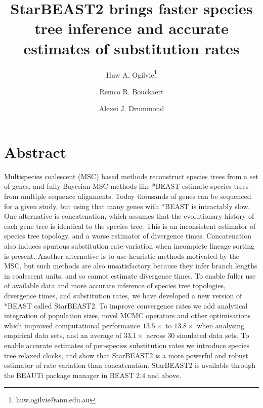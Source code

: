 \documentclass[12pt]{article}
\begin{document}
\title{StarBEAST2 brings faster species tree inference and accurate estimates of substitution rates}
\author[1,2]{Huw A. Ogilvie\thanks{huw.ogilvie@anu.edu.au}}
\author[2,3]{Remco R. Bouckaert}
\author[2,3]{Alexei J. Drummond}

\maketitle

\clearpage

\justifying

\section*{Abstract}

Multispecies coalescent (MSC) based methods reconstruct species trees from a
set of genes, and fully Bayesian MSC methods like *BEAST estimate species
trees from multiple sequence alignments. Today thousands of genes can be
sequenced for a given study, but using that many genes with *BEAST is
intractably slow. One alternative is concatenation, which assumes that the
evolutionary history of each gene tree is identical to the species tree. This
is an inconsistent estimator of species tree topology, and a worse estimator
of divergence times. Concatenation also induces spurious substitution rate
variation when incomplete lineage sorting is present. Another alternative is
to use heuristic methods motivated by the MSC, but such methods are also
unsatisfactory because they infer branch lengths in coalescent units, and so
cannot estimate divergence times. To enable fuller use of available data and
more accurate inference of species tree topologies, divergence times, and
substitution rates, we have developed a new version of *BEAST called
StarBEAST2. To improve convergence rates we add analytical integration of
population sizes, novel MCMC operators and other optimisations which improved
computational performance $13.5\times$ to $13.8\times$ when analysing
empirical data sets, and an average of $33.1\times$ across 30 simulated data
sets. To enable accurate estimates of per-species substitution rates we
introduce species tree relaxed clocks, and show that StarBEAST2 is a more
powerful and robust estimator of rate variation than concatenation. StarBEAST2
is available through the BEAUTi package manager in BEAST 2.4 and above.
\end{document}

